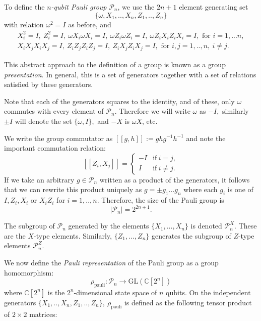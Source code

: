 \documentclass[11pt,oneside]{article}
\def\Complex{\mathbb{C}}
\def\Pauli{\mathcal{P}}
\def\GL{\mathrm{GL}}
\begin{document}
To define
the {\it $n$-qubit Pauli group} $\Pauli_n$, 
we use the $2n+1$ element 
generating set 
$$\{\omega , X_1, .., X_n, Z_1, .., Z_n\}$$
with relation $\omega^2=I$ as before, and
\begin{equation}\label{presentation}
\begin{array}{c}
X_i^2=I,\ Z_i^2=I,\ \omega X_i\omega X_i=I,\ \omega Z_i\omega Z_i=I,\ \omega Z_iX_iZ_iX_i=I, 
\mbox{\ for\ } i=1,...n,\\
X_iX_jX_iX_j=I,\ 
Z_iZ_jZ_iZ_j=I,\ 
Z_iX_jZ_iX_j=I, \mbox{\ for\ } i, j = 1,..,n,\ i\ne j.
\end{array}
\end{equation}

This abstract approach to the definition of a group is known as
a group \emph{presentation}. In general, this is a set of
generators together with a set of relations satisfied
by these generators.

Note that each of the generators squares to the identity,
and of these, only $\omega$ commutes with every element of $\Pauli_n.$
Therefore we will write $\omega$ as $-I,$
similarly $\pm I$ will denote the
set $\{\omega, I\},$ and $-X$ is $\omega X$, etc.

We write the group commutator as
$[[g, h]]:=ghg^{-1}h^{-1}$
and note the important commutation relation:
$$
    [[Z_i, X_j]] = 
    \left\{ \begin{array}{ll}
 -I &\mbox{if}\ i=j,\\
 I &\mbox{if}\ i\ne j.\end{array}\right.
$$
If we take an arbitrary $g\in \Pauli_n$
written as a product of the generators,
it follows that we can rewrite this
product uniquely as %
$ g = \pm g_1 ... g_n $
where each $g_i$ is one of $I, Z_i, X_i$ or $X_i Z_i$
for $i=1,..,n.$
Therefore, the size of the
Pauli group is 
$$
    |\Pauli_n| = 2^{2n+1}.
$$

The subgroup of $\Pauli_n$ generated by
the elements $\{X_1,...,X_n\}$ %
is denoted $\Pauli_n^X.$ These are the $X$-type
elements. Similarly,
 $\{Z_1,...,Z_n\}$ generates %
the subgroup of $Z$-type elements $\Pauli_n^Z$.

We now define the
{\it Pauli representation} 
of the Pauli group as a group homomorphism:
$$
    \rho_{\mathrm{pauli}} : \Pauli_n \to \GL(\Complex[2^n])
$$
where $\Complex[2^n]$ is the $2^n$-dimensional state space of $n$ qubits.
On the independent generators 
$\{X_1, .., X_n, Z_1, .., Z_n\},\ \rho_{\mathrm{pauli}}$
is defined as the following tensor product of $2\times 2$ matrices:
\end{document}
